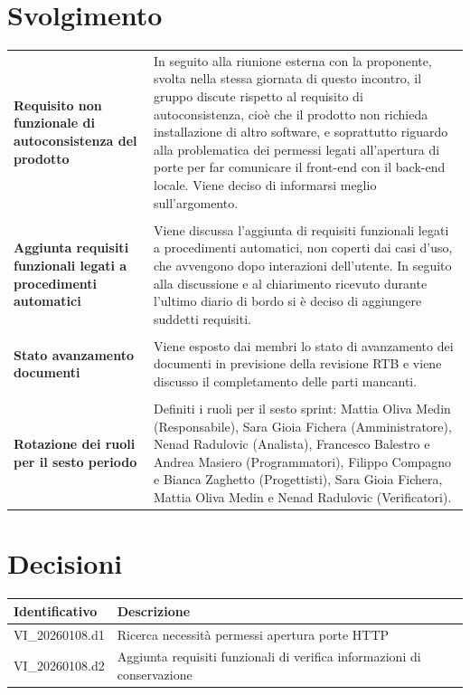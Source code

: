 \documentclass[a4paper,12pt]{article}
\begin{document}
\section{Svolgimento}
\begin{longtable}{p{5cm}|p{10cm}}
\textbf{Requisito non funzionale di autoconsistenza del prodotto} & In seguito alla riunione esterna con la proponente, svolta nella stessa giornata di questo incontro, il gruppo discute rispetto al requisito di autoconsistenza, cioè che il prodotto non richieda installazione di altro software, e soprattutto riguardo alla problematica dei permessi legati all'apertura di porte per far comunicare il front-end con il back-end locale. Viene deciso di informarsi meglio sull'argomento. \\\\ 

\textbf{Aggiunta requisiti funzionali legati a procedimenti automatici} & Viene discussa l'aggiunta di requisiti funzionali legati a procedimenti automatici, non coperti dai casi d'uso, che avvengono dopo interazioni dell'utente. In seguito alla discussione e al chiarimento ricevuto durante l'ultimo diario di bordo si è deciso di aggiungere suddetti requisiti. \\\\

\textbf{Stato avanzamento documenti} & Viene esposto dai membri lo stato di avanzamento dei documenti in previsione della revisione RTB e viene discusso il completamento delle parti mancanti. \\\\

\textbf{Rotazione dei ruoli per il sesto periodo} & Definiti i ruoli per il sesto sprint: Mattia Oliva Medin (Responsabile), Sara Gioia Fichera (Amministratore), Nenad Radulovic (Analista), Francesco Balestro e Andrea Masiero (Programmatori), Filippo Compagno e Bianca Zaghetto (Progettisti), Sara Gioia Fichera, Mattia Oliva Medin e Nenad Radulovic (Verificatori). \\
\end{longtable}

\section{Decisioni}
\begin{tabularx}{\textwidth}{|l|X|}
    \hline
    \textbf{Identificativo} & \textbf{Descrizione} \\
    \hline
    VI\_20260108.d1 & Ricerca necessità permessi apertura porte HTTP \\
    \hline
    VI\_20260108.d2 & Aggiunta requisiti funzionali di verifica informazioni di conservazione \\
    \hline
\end{tabularx}
\end{document}
